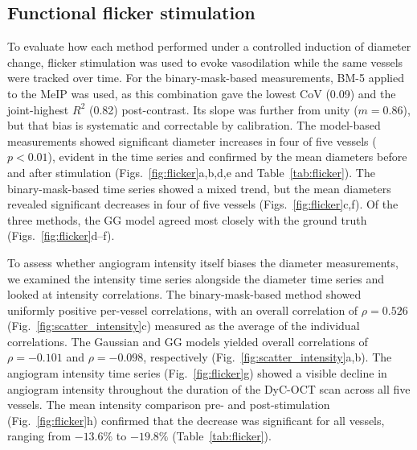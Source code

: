 \subsection{Functional flicker stimulation}
\label{subsec:flicker}  
To evaluate how each method performed under a controlled induction of diameter change, flicker stimulation was used to evoke vasodilation while the same vessels were tracked over time. For the binary-mask-based measurements, BM-5 applied to the MeIP was used, as this combination gave the lowest CoV (0.09) and the joint-highest $R^2$ (0.82) post-contrast. Its slope was further from unity ($m = 0.86$), but that bias is systematic and correctable by calibration. The model-based measurements showed significant diameter increases in four of five vessels ($p < 0.01$), evident in the time series and confirmed by the mean diameters before and after stimulation (Figs.~\ref{fig:flicker}a,b,d,e and Table~\ref{tab:flicker}). The binary-mask-based time series showed a mixed trend, but the mean diameters revealed significant decreases in four of five vessels (Figs.~\ref{fig:flicker}c,f). Of the three methods, the GG model agreed most closely with the ground truth (Figs.~\ref{fig:flicker}d--f).

To assess whether angiogram intensity itself biases the diameter measurements, we examined the intensity time series alongside the diameter time series and looked at intensity correlations. The binary-mask-based method showed uniformly positive per-vessel correlations, with an overall correlation of $\rho = 0.526$ (Fig.~\ref{fig:scatter_intensity}c) measured as the average of the individual correlations. The Gaussian and GG models yielded overall correlations of $\rho = -0.101$ and $\rho = -0.098$, respectively (Fig.~\ref{fig:scatter_intensity}a,b). The angiogram intensity time series (Fig.~\ref{fig:flicker}g) showed a visible decline in angiogram intensity throughout the duration of the DyC-OCT scan across all five vessels. The mean intensity comparison pre- and post-stimulation (Fig.~\ref{fig:flicker}h) confirmed that the decrease was significant for all vessels, ranging from $-13.6\%$ to $-19.8\%$ (Table~\ref{tab:flicker}). 


